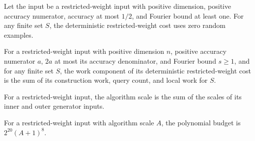 \begin{theorem}
\label{FABL.deterministicRestrictedWeightCost_randomExamples}
\leanok
{}
Let the input be a restricted-weight input with positive dimension, positive accuracy
numerator, accuracy at most $1/2$, and Fourier bound at least one. For any finite set
$S$, the deterministic restricted-weight cost uses zero random examples.
\end{theorem}

\begin{theorem}
\label{FABL.deterministicRestrictedWeightCost_work}
\leanok
{}
For a restricted-weight input with positive dimension $n$, positive accuracy numerator
$a$, $2a$ at most its accuracy denominator, and Fourier bound $s \ge 1$, and for any
finite set $S$, the work component of its deterministic restricted-weight cost is the
sum of its construction work, query count, and local work for $S$.
\end{theorem}

\begin{definition}
\label{FABL.RestrictedWeightInput.algorithmScale}
\leanok
{}
For a restricted-weight input, the algorithm scale is the sum of the scales of its inner
and outer generator inputs.
\end{definition}

\begin{definition}
\label{FABL.RestrictedWeightInput.polynomialBudget}
\leanok
{}
For a restricted-weight input with algorithm scale $A$, the polynomial budget is
$2^{20}(A+1)^8$.
\end{definition}

